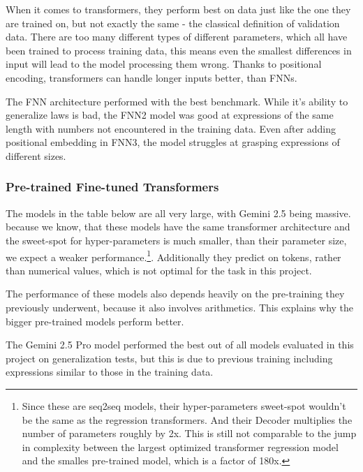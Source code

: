 \documentclass{article}
\begin{document}
When it comes to transformers, they perform best on data just like the one they 
are trained on, but not exactly the same - the classical definition of 
validation data. There are too many different types of different parameters, 
which all have been trained to process training data, this means even the 
smallest differences in input will lead to the model processing them wrong.
Thanks to positional encoding, transformers can handle longer inputs better, 
than FNNs.

The FNN architecture performed with the best benchmark. While it's ability to 
generalize laws is bad, the FNN2 model was good at expressions of the same 
length with numbers not encountered in the training data. Even after adding 
positional embedding in FNN3, the model struggles at grasping expressions of 
different sizes.

\subsubsection{Pre-trained Fine-tuned Transformers}

The models in the table below are all very large, with Gemini 2.5 being massive. 
because we know, that these models have the same transformer architecture and 
the sweet-spot for hyper-parameters is much smaller, than their parameter size, 
we expect a weaker performance.\footnote{Since these are seq2seq models, their 
hyper-parameters sweet-spot wouldn't be the same as the regression transformers. 
And their Decoder multiplies the number of parameters roughly by 2x. This is 
still not comparable to the jump in complexity between the largest optimized 
transformer regression model and the smalles pre-trained model, which is a 
factor of 180x.}. Additionally they predict on tokens, rather than numerical 
values, which is not optimal for the task in this project.

The performance of these models also depends heavily on the pre-training they 
previously underwent, because it also involves arithmetics. This explains why 
the bigger pre-trained models perform better.

The Gemini 2.5 Pro model performed the best out of all models evaluated in this 
project on generalization tests, but this is due to previous training including 
expressions similar to those in the training data.


\newpage
\printbibliography[heading=bibintoc]
\end{document}
